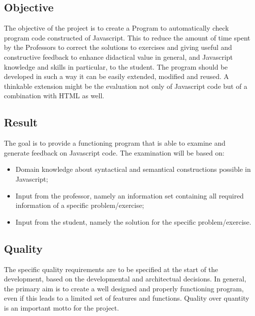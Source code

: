 \documentclass{article}
\begin{document}
\subsection{Objective}

The objective of the project is to create a Program to automatically check
program code constructed of Javascript. This to reduce the amount of time spent
by the Professors to correct the solutions to exercises and giving useful and
constructive feedback to enhance didactical value in general, and Javascript
knowledge and skills in particular, to the student. The program should be
developed in such a way it can be easily extended, modified and reused. A
thinkable extension might be the evaluation not only of Javascript code but of
a combination with HTML as well.

\subsection{Result}

The goal is to provide a functioning program that is able to examine and
generate feedback on Javascript code. The examination will be based on:

\begin{itemize}
  \item Domain knowledge about syntactical and semantical constructions
    possible in Javascript;
  \item Input from the professor, namely an information set containing all
    required information of a specific problem/exercise;
  \item Input from the student, namely the solution for the specific
    problem/exercise.
\end{itemize}

\subsection{Quality}

The specific quality requirements are to be specified at the start of the
development, based on the developmental and architectual decisions. In general,
the primary aim is to create a well designed and properly functioning program,
even if this leads to a limited set of features and functions. Quality over
quantity is an important motto for the project.
\end{document}
